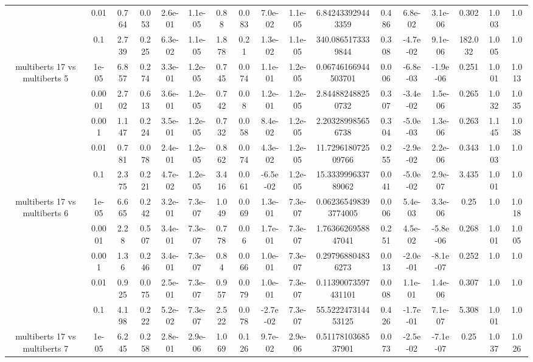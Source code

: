 \begin{tabular}{|c|c|c|c|c|c|c|c|c|c|c|c|c|c|c|c|c|}
 & 0.01 & 0.764 & 0.053 & 2.6e-01 & 1.1e-05 & 0.88 & 0.083 & 7.0e-02 & 1.1e-05 & 6.842433929443359 & 0.486 & 6.8e-02 & 3.1e-06 & 0.302 & 1.003 & 1.0 \\
 & 0.1 & 2.739 & 0.225 & 6.3e-02 & 1.1e-05 & 1.878 & 0.21 & 1.3e-02 & 1.1e-05 & 340.0865173339844 & 0.308 & -4.7e-02 & 9.1e-06 & 182.032 & 1.005 & 1.0 \\
\hline
\multirow{5}{*}{multiberts 17 vs multiberts 5} & 1e-05 & 6.857 & 0.274 & 3.3e-01 & 1.2e-05 & 0.745 & 0.074 & 1.1e-01 & 1.2e-05 & 0.06746166944503701 & 0.006 & -6.8e-03 & -1.9e-06 & 0.251 & 1.001 & 1.013 \\
 & 0.0001 & 2.702 & 0.613 & 3.6e-01 & 1.2e-05 & 0.742 & 0.08 & 1.2e-01 & 1.2e-05 & 2.844882488250732 & 0.307 & -3.4e-02 & 1.5e-06 & 0.265 & 1.032 & 1.035 \\
 & 0.001 & 1.147 & 0.224 & 3.5e-01 & 1.2e-05 & 0.732 & 0.058 & 8.4e-02 & 1.2e-05 & 2.203289985656738 & 0.304 & -5.0e-03 & 1.3e-06 & 0.263 & 1.145 & 1.038 \\
 & 0.01 & 0.781 & 0.078 & 2.4e-01 & 1.2e-05 & 0.862 & 0.074 & 4.3e-02 & 1.2e-05 & 11.729618072509766 & 0.255 & -2.9e-02 & 2.2e-06 & 0.343 & 1.003 & 1.0 \\
 & 0.1 & 2.375 & 0.221 & 4.7e-02 & 1.2e-05 & 3.416 & 0.061 & -6.5e-02 & 1.2e-05 & 15.333999633789062 & 0.041 & -5.0e-02 & 2.9e-07 & 3.435 & 1.001 & 1.0 \\
\hline
\multirow{5}{*}{multiberts 17 vs multiberts 6} & 1e-05 & 6.665 & 0.242 & 3.2e-01 & 7.3e-07 & 1.049 & 0.069 & 1.3e-01 & 7.3e-07 & 0.062365498393774005 & 0.006 & 5.4e-03 & 3.3e-06 & 0.25 & 1.0 & 1.018 \\
 & 0.0001 & 2.28 & 0.507 & 3.4e-01 & 7.3e-07 & 0.778 & 0.06 & 1.7e-01 & 7.3e-07 & 1.7636626958847041 & 0.251 & 4.5e-02 & -5.8e-06 & 0.268 & 1.001 & 1.005 \\
 & 0.001 & 1.36 & 0.246 & 3.4e-01 & 7.3e-07 & 0.84 & 0.066 & 1.0e-01 & 7.3e-07 & 0.297968804836273 & 0.013 & -2.0e-01 & -8.1e-07 & 0.252 & 1.0 & 1.0 \\
 & 0.01 & 0.925 & 0.075 & 2.5e-01 & 7.3e-07 & 0.957 & 0.079 & 1.0e-01 & 7.3e-07 & 0.11390073597431101 & 0.008 & 1.1e-01 & 1.4e-06 & 0.307 & 1.0 & 1.0 \\
 & 0.1 & 4.198 & 0.222 & 5.2e-02 & 7.3e-07 & 2.522 & 0.078 & -2.7e-02 & 7.3e-07 & 55.522247314453125 & 0.426 & -1.7e-01 & 7.1e-07 & 5.308 & 1.001 & 1.0 \\
\hline
\multirow{5}{*}{multiberts 17 vs multiberts 7} & 1e-05 & 6.245 & 0.258 & 2.8e-01 & 2.9e-06 & 1.069 & 0.126 & 9.7e-02 & 2.9e-06 & 0.5117810368537901 & 0.073 & -2.5e-02 & -7.1e-07 & 0.25 & 1.037 & 1.026 \\

\end{tabular}
